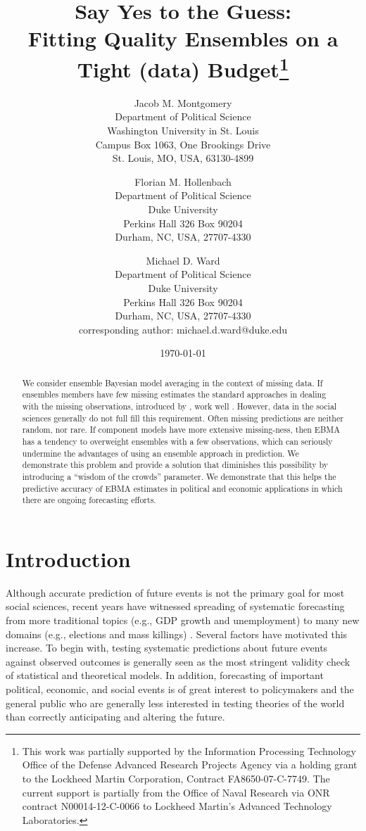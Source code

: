 \documentclass[12pt,fullpage,endnotes]{article}
\title{Say Yes to the Guess: \\ Fitting Quality Ensembles on a Tight
  (data) Budget\thanks{This work was partially supported by the Information Processing Technology Office of the Defense Advanced Research Projects Agency via a holding grant to the Lockheed Martin Corporation, Contract FA8650-07-C-7749. The current support is partially from the Office of Naval Research via ONR contract N00014-12-C-0066 to Lockheed Martin's Advanced Technology Laboratories.
    }}
\author{
Jacob M. Montgomery\\
	Department of Political Science\\
	Washington University in St. Louis\\
	Campus Box 1063, One Brookings Drive\\
	St. Louis, MO, USA, 63130-4899 
	\and
Florian M. Hollenbach  \\
	Department of Political Science\\
	Duke University\\
	Perkins Hall 326 Box 90204\\
	Durham, NC, USA, 27707-4330
	\and
Michael D. Ward\\
	Department of Political Science\\
	Duke University\\
	Perkins Hall 326 Box 90204\\
	Durham, NC, USA, 27707-4330\\
	corresponding author: michael.d.ward@duke.edu
}
\date{\today}
\begin{document}
\maketitle
\thispagestyle{empty}
\clearpage
\pagestyle{myheadings}
\newpage

\thispagestyle{empty}


\begin{abstract}
We consider ensemble Bayesian model averaging in the context of missing data.  If ensembles members have few missing estimates the standard approaches in dealing with the missing observations, introduced by \citet{Fraley:2010}, work well . However, data in the social sciences generally do not full fill this requirement. Often missing predictions are neither random, nor rare. If component models have more extensive missing-ness, then EBMA has a tendency to overweight ensembles with a few observations, which can seriously undermine the advantages of using an ensemble approach in prediction.  We demonstrate this problem and provide a solution that diminishes this possibility by introducing a ``wisdom of the crowds'' parameter. We demonstrate that this helps the predictive accuracy of EBMA estimates in political and economic applications in which there are ongoing forecasting efforts.
\end{abstract}

\doublespacing


\setcounter{page}{1}

\section{Introduction}
Although accurate prediction of future events is not the primary goal
for most social sciences, recent years have witnessed spreading of
systematic forecasting from more traditional topics (e.g., GDP growth
and unemployment) to many new domains (e.g., elections and mass
killings) .  Several factors have motivated this increase.  To begin
with, testing systematic predictions about future events against
observed outcomes is generally seen as the most stringent validity
check of statistical and theoretical models.  In addition, forecasting
of important political, economic, and social events is of great
interest to policymakers and the general public who are generally less
interested in testing theories of the world than correctly anticipating
and altering the future.
\end{document}
